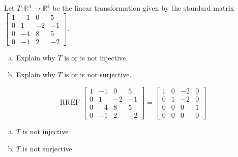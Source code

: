 
\begin{exerciseStatement}
 Let \(T:\mathbb{R}^ 4  \to \mathbb{R}^ 4 \) be the linear transformation given by the standard matrix \( \left[\begin{array}{cccc}
1 & -1 & 0 & 5 \\
0 & 1 & -2 & -1 \\
0 & -4 & 8 & 5 \\
0 & -1 & 2 & -2
\end{array}\right] .\)
\begin{enumerate}[(a)]
\item Explain why \(T\) is or is not injective.
\item Explain why \(T\) is or is not surjective.
\end{enumerate}
    
\end{exerciseStatement}
    
\begin{exerciseAnswer} 


\[\operatorname{RREF} \left[\begin{array}{cccc}
1 & -1 & 0 & 5 \\
0 & 1 & -2 & -1 \\
0 & -4 & 8 & 5 \\
0 & -1 & 2 & -2
\end{array}\right] = \left[\begin{array}{cccc}
1 & 0 & -2 & 0 \\
0 & 1 & -2 & 0 \\
0 & 0 & 0 & 1 \\
0 & 0 & 0 & 0
\end{array}\right] \]


\begin{enumerate}[(a)]
\item \(T\) is not injective
\item \(T\) is not surjective
\end{enumerate}
    
\end{exerciseAnswer}
    
